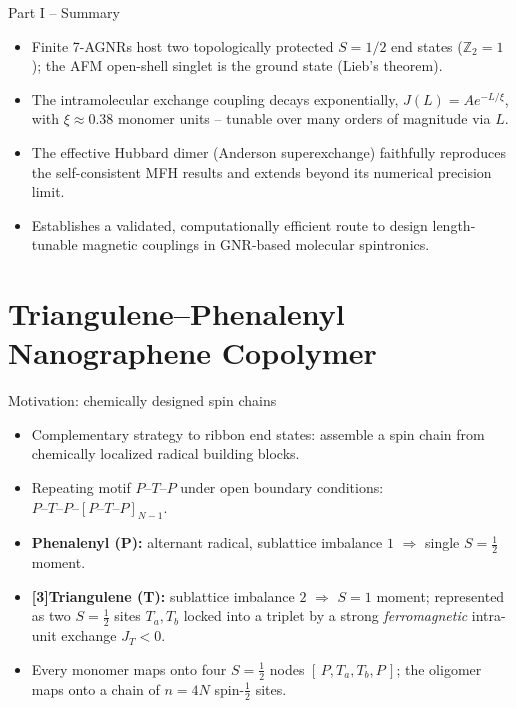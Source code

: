 \documentclass[aspectratio=169,11pt]{beamer}
\begin{document}
\begin{frame}{Part I -- Summary}
  \begin{itemize}
    \item Finite 7-AGNRs host two topologically protected $S=1/2$ end states ($\mathbb{Z}_2=1$); the AFM open-shell singlet is the ground state (Lieb's theorem).
    \item The intramolecular exchange coupling decays exponentially, $J(L)=Ae^{-L/\xi}$, with $\xi \approx 0.38$ monomer units -- tunable over many orders of magnitude via $L$.
    \item The effective Hubbard dimer (Anderson superexchange) faithfully reproduces the self-consistent MFH results and extends beyond its numerical precision limit.
    \item Establishes a validated, computationally efficient route to design length-tunable magnetic couplings in GNR-based molecular spintronics.
  \end{itemize}
\end{frame}

\section{Triangulene--Phenalenyl Nanographene Copolymer}

\begin{frame}{Motivation: chemically designed spin chains}
  \begin{itemize}
    \item Complementary strategy to ribbon end states: assemble a spin chain from \alert{chemically localized radical building blocks}.
    \item Repeating motif $P\text{--}T\text{--}P$ under open boundary conditions: $P\text{--}T\text{--}P\text{--}[P\text{--}T\text{--}P]_{N-1}$.
    \item \textbf{Phenalenyl (P):} alternant radical, sublattice imbalance $1$ $\Rightarrow$ single $S=\tfrac12$ moment.
    \item \textbf{[3]Triangulene (T):} sublattice imbalance $2$ $\Rightarrow$ $S=1$ moment; represented as two $S=\tfrac12$ sites $T_a,T_b$ locked into a triplet by a strong \emph{ferromagnetic} intra-unit exchange $J_T<0$.
    \item Every monomer maps onto four $S=\tfrac12$ nodes $[\,P,T_a,T_b,P\,]$; the oligomer maps onto a chain of $n=4N$ spin-$\tfrac12$ sites.
  \end{itemize}
\end{frame}
\end{document}
